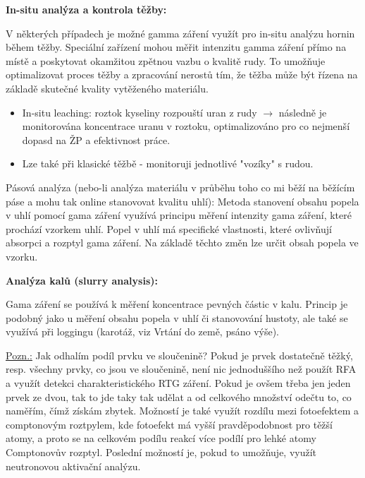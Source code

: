 \textbf{In-situ analýza a kontrola těžby:}

V některých případech je možné gamma záření využít pro in-situ analýzu hornin během těžby. Speciální zařízení mohou měřit intenzitu gamma záření přímo na místě a poskytovat okamžitou zpětnou vazbu o kvalitě rudy. To umožňuje optimalizovat proces těžby a zpracování nerostů tím, že těžba může být řízena na základě skutečné kvality vytěženého materiálu.

\begin{itemize}
    \item In-situ leaching: roztok kyseliny rozpouští uran z rudy $\rightarrow$ následně je monitorována koncentrace uranu v roztoku, optimalizováno pro co nejmenší dopasd na ŽP a efektivnost práce.
    \item Lze také při klasické těžbě - monitoruji jednotlivé "vozíky" s rudou.
\end{itemize}


Pásová analýza (nebo-li analýza materiálu v průběhu toho co mi běží na běžícím páse a mohu tak online stanovovat kvalitu uhlí): Metoda stanovení obsahu popela v uhlí pomocí gama záření využívá principu měření intenzity gama záření, které prochází vzorkem uhlí. Popel v uhlí má specifické vlastnosti, které ovlivňují absorpci a rozptyl gama záření. Na základě těchto změn lze určit obsah popela ve vzorku.

\textbf{Analýza kalů (slurry analysis):} 

Gama záření se používá k měření koncentrace pevných částic v kalu. Princip je podobný jako u měření obsahu popela v uhlí či stanovování hustoty, ale také se využívá při loggingu (karotáž, viz Vrtání do země, psáno výše).

\underline{Pozn.:} Jak odhalím podíl prvku ve sloučenině? Pokud je prvek dostatečně těžký, resp. všechny prvky, co jsou ve sloučenině, není nic jednoduššího než použít RFA a využít detekci charakteristického RTG záření. Pokud je ovšem třeba jen jeden prvek ze dvou, tak to jde taky tak udělat a od celkového množství odečtu to, co naměřím, čímž získám zbytek. Možností je také využít rozdílu mezi fotoefektem a comptonovým roztpylem, kde fotoefekt má vyšší pravděpodobnost pro těžší atomy, a proto se na celkovém podílu reakcí více podílí pro lehké atomy Comptonovův rozptyl. Poslední možností je, pokud to umožňuje, využít neutronovou aktivační analýzu.